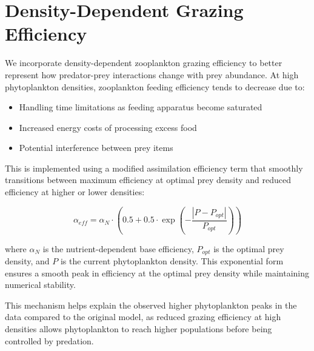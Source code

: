 \section{Density-Dependent Grazing Efficiency}

We incorporate density-dependent zooplankton grazing efficiency to better represent how predator-prey interactions change with prey abundance. At high phytoplankton densities, zooplankton feeding efficiency tends to decrease due to:

\begin{itemize}
\item Handling time limitations as feeding apparatus become saturated
\item Increased energy costs of processing excess food
\item Potential interference between prey items
\end{itemize}

This is implemented using a modified assimilation efficiency term that smoothly transitions between maximum efficiency at optimal prey density and reduced efficiency at higher or lower densities:

\[ \alpha_{eff} = \alpha_N \cdot (0.5 + 0.5 \cdot \exp(-\frac{|P - P_{opt}|}{P_{opt}})) \]

where $\alpha_N$ is the nutrient-dependent base efficiency, $P_{opt}$ is the optimal prey density, and $P$ is the current phytoplankton density. This exponential form ensures a smooth peak in efficiency at the optimal prey density while maintaining numerical stability.

This mechanism helps explain the observed higher phytoplankton peaks in the data compared to the original model, as reduced grazing efficiency at high densities allows phytoplankton to reach higher populations before being controlled by predation.
